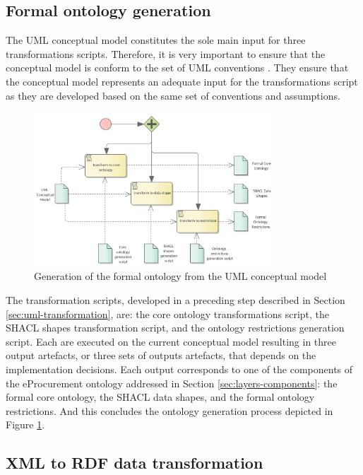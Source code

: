 	\subsection{Formal ontology generation}
	\label{sec:ontology-generation}
	
	The UML conceptual model constitutes the sole main input for three transformations scripts. Therefore, it is very important to ensure that the conceptual model is conform to the set of UML conventions \cite{costetchi2020b}. They ensure that the conceptual model represents an adequate input for the transformations script as they are developed based on the same set of conventions and assumptions.
		
	\begin{figure}[!ht]		
		\centering
		\includegraphics[width=0.8\textwidth]{../img/formalOntologyGeneration.png}
		\caption{Generation of the formal ontology from the UML conceptual model}
		\label{fig:ontology-generation}
	\end{figure}
	
	The transformation scripts, developed in a preceding step described in Section \ref{sec:uml-transformation}, are: the core ontology transformations script, the SHACL shapes transformation script, and the ontology restrictions generation script. Each are executed on the current conceptual model resulting in three output artefacts,  or three sets of outputs artefacts, that depends on the implementation decisions. Each output corresponds to one of the components of the eProcurement ontology addressed in Section \ref{sec:layers-components}: the formal core ontology, the SHACL data shapes, and the formal ontology restrictions. And this concludes the ontology generation process depicted in Figure \ref{fig:ontology-generation}. 	

	\subsection{XML to RDF data transformation}
	\label{sec:xml2rdf}

